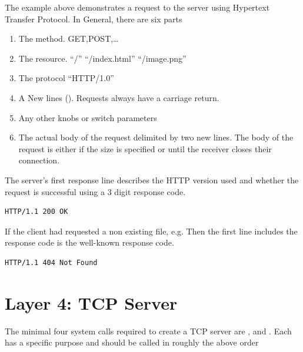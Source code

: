 The example above demonstrates a request to the server using Hypertext Transfer Protocol.
In General, there are six parts

\begin{enumerate}
\item The method. GET,POST,\ldots{}
\item The resource. ``/'' ``/index.html'' ``/image.png''
\item The protocol ``HTTP/1.0''
\item A New lines (\keyword{\\r\\n}). Requests always have a carriage return.
\item Any other knobs or switch parameters
\item The actual body of the request delimited by two new lines. The body of the request is either if the size is specified or until the receiver closes their connection.
\end{enumerate}

The server's first response line describes the HTTP version used and whether the request is successful using a 3 digit response code.

\begin{lstlisting}
HTTP/1.1 200 OK
\end{lstlisting}

If the client had requested a non existing file, e.g.
 Then the first line includes the response code is the well-known  response code.

\begin{lstlisting}
HTTP/1.1 404 Not Found
\end{lstlisting}


\section{Layer 4: TCP Server}

The minimal four system calls required to create a TCP server are ,   and .
Each has a specific purpose and should be called in roughly the above order

